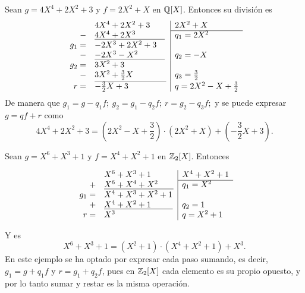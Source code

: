     \begin{ejs}\label{ej:algoritmo_division_polinomio}
        \item Sean $g = 4X^4 + 2X^2 + 3$ y $f = 2X^2 + X$ en $\mathbb{Q}[X]$. Entonces su división es
        \[
            \begin{array}{rl|l}
                &4X^4 + 2X^2 + 3 & 2X^2 + X \\\cline{3-3} 
                - & \underline{4X^4 + 2X^3\phantom{X+ 1x.}} & q_1 = 2X^2\\
                g_1 =&-2X^3 + 2X^2 + 3 &  \\
                -&\underline{-2X^3 - X^2\phantom{X+ 1x}} & q_2 = -X\\
                g_2 =&3X^2 + 3&  \\
                -&\underline{3X^2 + \frac{3}{2}X\phantom{{ X.....} + 1}} & q_3= \frac{3}{2}\\
                r =&-\frac{3}{2}X + 3 &  q = 2X^2 -X + \frac{3}{2}
            \end{array}
        \]
        De manera que \(g_1 = g - q_1f;\ g_2 = g_1 - q_2f;\ r = g_2 - q_3f;\) y se puede expresar $g = qf+ r$ como $$ 4X^4 + 2X^2 + 3 = (2X^2 -X + \frac{3}{2})\cdot (2X^2 + X) + (-\frac{3}{2}X + 3).$$

        \item Sean $g = X^6 + X^3 + 1$ y $f = X^4 + X^2 + 1$ en $\mathbb{Z}_2[X]$. Entonces 
        
        \[
            \begin{array}{rl|l}
                &X^6 + X^3 + 1 & X^4 + X^2 + 1 \\\cline{3-3} 
                + & \underline{X^6 + X^4 + X^2\phantom{Xlll}} & q_1 = X^2\\
                 g_1 =&X^4 + X^3 + X^2 + 1 &  \\
                + &\underline{X^4 + X^2 + 1\phantom{{ X} + 1}} &q_2 =1\\
                 r =&X^3 &  q = X^2 +1
            \end{array}
        \]
        
        Y es $$X^6 + X^3 + 1 = (X^2 + 1)\cdot (X^4 +X^2 + 1) + X^3.$$En este ejemplo se ha optado por expresar cada paso sumando, es decir, $g_1 = g + q_1f$ y $r = g_1 + q_2f$, pues en $\mathbb{Z}_2[X]$ cada elemento es su propio opuesto, y por lo tanto sumar y restar es la misma operación.
    \end{ejs}


